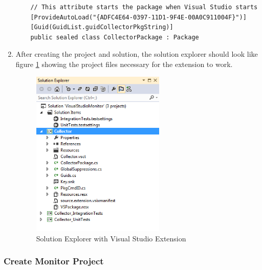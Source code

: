 \begin{enumerate}
\begin{lstlisting}
    // This attribute starts the package when Visual Studio starts 
    [ProvideAutoLoad("{ADFC4E64-0397-11D1-9F4E-00A0C911004F}")]
    [Guid(GuidList.guidCollectorPkgString)]
    public sealed class CollectorPackage : Package
\end{lstlisting}

\item
After creating the project and solution, the solution explorer should look like figure \ref{fig:SolutionExplorer} showing the project files necessary for the extension to work.
\begin{figure}
	\centering
	\includegraphics[width=2.5in]{Graphics/SolutionExplorer.png}
	\caption{Solution Explorer with Visual Studio Extension}
	\label{fig:SolutionExplorer}
\end{figure}
\end{enumerate}

\subsubsection{Create Monitor Project}

